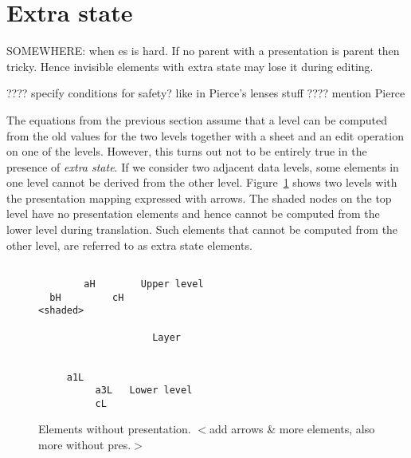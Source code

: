 %										
%										
\section{Extra state} \label{sect:extraState}

SOMEWHERE: when es is hard. If no parent with a presentation is parent then tricky. Hence invisible elements with extra state may lose it during editing.

???? specify conditions for safety? like in Pierce's lenses stuff
???? mention Pierce

The equations from the previous section assume that a level can be computed from the old values for the two levels together with a sheet and an edit operation on one of the levels. However, this turns out not to be entirely true in the presence of {\em extra state}. If we consider two adjacent data levels, some elements in one level cannot be derived from the other level. Figure~\ref{nodeMapping2} shows two levels with the presentation mapping expressed with arrows. The shaded nodes on the top level have no presentation elements and hence cannot be computed from the lower level during translation. Such elements that cannot be computed from the other level, are referred to as extra state elements.  


%
\begin{figure}
\begin{center}
\begin{center}
\begin{verbatim}

        aH        Upper level
  bH         cH
<shaded>

                    Layer

 
     a1L 
          a3L   Lower level
          cL
\end{verbatim}
\end{center}
\caption{Elements without presentation. $<$add arrows \& more elements, also more without pres.$>$}\label{nodeMapping2} 
\end{center}
\end{figure}



